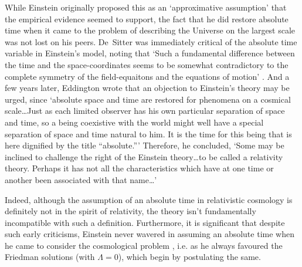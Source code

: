 \documentclass[11pt]{article}
\begin{document}
While Einstein originally proposed this as an `approximative assumption' that the empirical evidence seemed to support, the fact that he did restore absolute time when it came to the problem of describing the Universe on the largest scale was not lost on his peers. De~Sitter was immediately critical of the absolute time variable in Einstein's model, noting that `Such a fundamental difference between the time and the space-coordinates seems to be somewhat contradictory to the complete symmetry of the field-equaitons and the equations of motion' \cite{deSitter1917a}. And a few years later, Eddington wrote that an objection to Einstein's theory may be urged, since \cite{Eddington1920} `absolute space and time are restored for phenomena on a cosmical scale\ldots Just as each limited observer has his own particular separation of space and time, so a being coexistive with the world might well have a special separation of space and time natural to him. It is the time for this being that is here dignified by the title ``absolute.{''}' Therefore, he concluded, `Some may be inclined to challenge the right of the Einstein theory\ldots to be called a relativity theory. Perhaps it has not all the characteristics which have at one time or another been associated with that name\ldots'

Indeed, although the assumption of an absolute time in relativistic cosmology is definitely not in the spirit of relativity, the theory isn't fundamentally incompatible with such a definition. Furthermore, it is significant that despite such early criticisms, Einstein never wavered in assuming an absolute time when he came to consider the cosmological problem \cite{Einstein1931b,Einstein1932,Einstein1945}, i.e. as he always favoured the Friedman solutions (with $\Lambda=0$), which begin by postulating the same.
\end{document}
